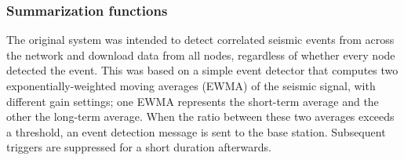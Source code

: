 
\subsubsection{Summarization functions}
\label{sec-casestudy-nuc}

The original system was intended to detect correlated seismic
events from across the network and download data from all nodes,
regardless of whether every node detected the event. This was based
on a simple event detector that computes two exponentially-weighted
moving averages (EWMA) of the seismic signal, with different gain
settings; one EWMA represents the short-term average and the other
the long-term average. When the ratio between these two averages
exceeds a threshold, an event detection message is sent to the base 
station. Subsequent triggers are suppressed for a short duration
afterwards.

